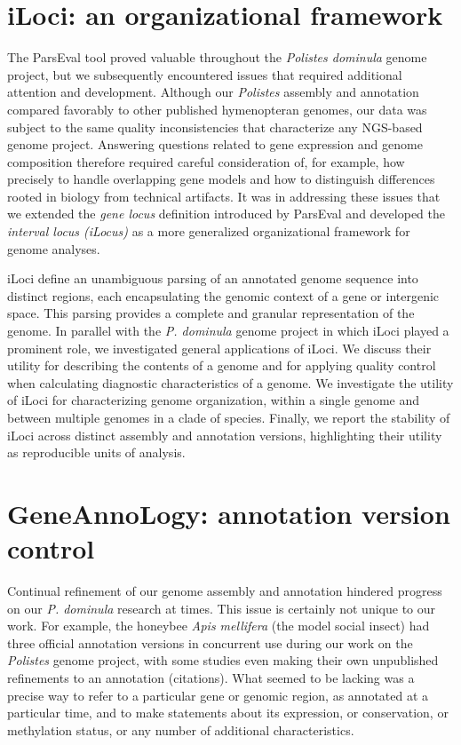 \section{iLoci: an organizational framework}

The ParsEval tool proved valuable throughout the \textit{Polistes dominula} genome project, but we subsequently encountered issues that required additional attention and development.
Although our \textit{Polistes} assembly and annotation compared favorably to other published hymenopteran genomes, our data was subject to the same quality inconsistencies that characterize any NGS-based genome project.
Answering questions related to gene expression and genome composition therefore required careful consideration of, for example, how precisely to handle overlapping gene models and how to distinguish differences rooted in biology from technical artifacts.
It was in addressing these issues that we extended the \textit{gene locus} definition introduced by ParsEval and developed the \textit{interval locus (iLocus)} as a more generalized organizational framework for genome analyses.

iLoci define an unambiguous parsing of an annotated genome sequence into distinct regions, each encapsulating the genomic context of a gene or intergenic space.
This parsing provides a complete and granular representation of the genome.
In parallel with the \textit{P. dominula} genome project in which iLoci played a prominent role, we investigated general applications of iLoci.
We discuss their utility for describing the contents of a genome and for applying quality control when calculating diagnostic characteristics of a genome.
We investigate the utility of iLoci for characterizing genome organization, within a single genome and between multiple genomes in a clade of species.
Finally, we report the stability of iLoci across distinct assembly and annotation versions, highlighting their utility as reproducible units of analysis.

\section{GeneAnnoLogy: annotation version control}

Continual refinement of our genome assembly and annotation hindered progress on our \textit{P. dominula} research at times.
This issue is certainly not unique to our work.
For example, the honeybee \textit{Apis mellifera} (the model social insect) had three official annotation versions in concurrent use during our work on the \textit{Polistes} genome project, with some studies even making their own unpublished refinements to an annotation (citations).
What seemed to be lacking was a precise way to refer to a particular gene or genomic region, as annotated at a particular time, and to make statements about its expression, or conservation, or methylation status, or any number of additional characteristics.

